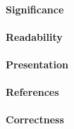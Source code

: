 \documentclass{jhps}
\begin{document}
\paragraph{Significance} %

\paragraph{Readability} %

\paragraph{Presentation}

\paragraph{References} %

\paragraph{Correctness} %
\end{document}
